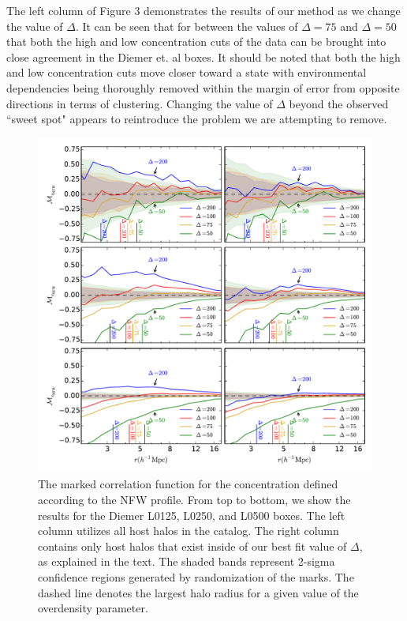 \documentclass[usenatbib,usegraphicx,letterpaper]{mn2e}
\begin{document}

The left column of Figure 3 demonstrates the results of our method as we change the value of $\Delta$. It can be seen that for between the values of $\Delta = 75$ and $\Delta = 50$ that both the high and low concentration cuts of the data can be brought into close agreement in the Diemer et. al boxes. It should be noted that both the high and low concentration cuts move closer toward a state with environmental dependencies being thoroughly removed within the margin of error from opposite directions in terms of clustering. Changing the value of $\Delta$ beyond the observed ``sweet spot" appears to reintroduce the problem we are attempting to remove.

\begin{figure}
	\centering
	\includegraphics[width=\textwidth]{all_mcf_cnfw_z00_hostsvmatch.pdf}
	\caption{The marked correlation function for the concentration defined according to the NFW profile. From top to bottom, we show the results for the Diemer L0125, L0250, and L0500 boxes. The left column utilizes all host halos in the catalog. The right column contains only host halos that exist inside of our best fit value of $\Delta$, as explained in the text. The shaded bands represent 2-sigma confidence regions generated by randomization of the marks. The dashed line denotes the largest halo radius for a given value of the overdensity parameter. }
\end{figure}
\end{document}
